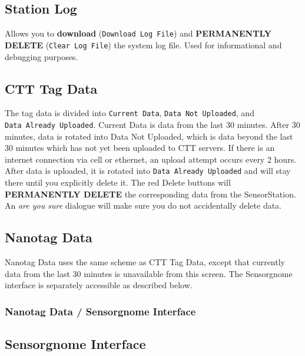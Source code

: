 \documentclass[
]{article}
\begin{document}
\hypertarget{station-log}{%
\subsection{Station Log}\label{station-log}}

Allows you to \textbf{download} (\texttt{Download\ Log\ File}) and
\textbf{PERMANENTLY DELETE} (\texttt{Clear\ Log\ File}) the system log
file. Used for informational and debugging purposes.

\hypertarget{ctt-tag-data}{%
\subsection{CTT Tag Data}\label{ctt-tag-data}}

The tag data is divided into \texttt{Current\ Data},
\texttt{Data\ Not\ Uploaded}, and \texttt{Data\ Already\ Uploaded}.
Current Data is data from the last 30 minutes. After 30 minutes, data is
rotated into Data Not Uploaded, which is data beyond the last 30 minutes
which has not yet been uploaded to CTT servers. If there is an internet
connection via cell or ethernet, an upload attempt occurs every 2 hours.
After data is uploaded, it is rotated into
\texttt{Data\ Already\ Uploaded} and will stay there until you
explicitly delete it. The red Delete buttons will \textbf{PERMANENTLY
DELETE} the corresponding data from the SensorStation. An \emph{are you
sure} dialogue will make sure you do not accidentally delete data.

\hypertarget{nanotag-data}{%
\subsection{Nanotag Data}\label{nanotag-data}}

Nanotag Data uses the same scheme as CTT Tag Data, except that currently
data from the last 30 minutes is unavailable from this screen. The
Sensorgnome interface is separately accessible as described below.

\hypertarget{nanotag-data-sensorgnome-interface}{%
\subsubsection{Nanotag Data / Sensorgnome
Interface}\label{nanotag-data-sensorgnome-interface}}

\hypertarget{sensorgnome-interface}{%
\subsection{Sensorgnome Interface}\label{sensorgnome-interface}}
\end{document}
